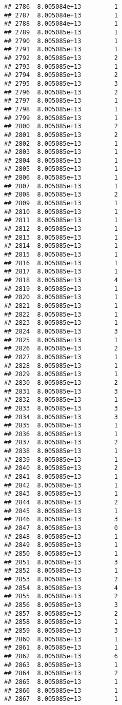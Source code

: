 \documentclass[
]{article}
\begin{document}
\begin{verbatim}
## 2786  8.005084e+13         1
## 2787  8.005084e+13         1
## 2788  8.005084e+13         1
## 2789  8.005085e+13         1
## 2790  8.005085e+13         1
## 2791  8.005085e+13         1
## 2792  8.005085e+13         2
## 2793  8.005085e+13         1
## 2794  8.005085e+13         2
## 2795  8.005085e+13         3
## 2796  8.005085e+13         2
## 2797  8.005085e+13         1
## 2798  8.005085e+13         1
## 2799  8.005085e+13         1
## 2800  8.005085e+13         2
## 2801  8.005085e+13         2
## 2802  8.005085e+13         1
## 2803  8.005085e+13         1
## 2804  8.005085e+13         1
## 2805  8.005085e+13         1
## 2806  8.005085e+13         1
## 2807  8.005085e+13         1
## 2808  8.005085e+13         2
## 2809  8.005085e+13         1
## 2810  8.005085e+13         1
## 2811  8.005085e+13         1
## 2812  8.005085e+13         1
## 2813  8.005085e+13         1
## 2814  8.005085e+13         1
## 2815  8.005085e+13         1
## 2816  8.005085e+13         1
## 2817  8.005085e+13         1
## 2818  8.005085e+13         4
## 2819  8.005085e+13         1
## 2820  8.005085e+13         1
## 2821  8.005085e+13         1
## 2822  8.005085e+13         1
## 2823  8.005085e+13         1
## 2824  8.005085e+13         3
## 2825  8.005085e+13         1
## 2826  8.005085e+13         2
## 2827  8.005085e+13         1
## 2828  8.005085e+13         1
## 2829  8.005085e+13         1
## 2830  8.005085e+13         2
## 2831  8.005085e+13         3
## 2832  8.005085e+13         1
## 2833  8.005085e+13         3
## 2834  8.005085e+13         3
## 2835  8.005085e+13         1
## 2836  8.005085e+13         1
## 2837  8.005085e+13         2
## 2838  8.005085e+13         1
## 2839  8.005085e+13         1
## 2840  8.005085e+13         2
## 2841  8.005085e+13         1
## 2842  8.005085e+13         1
## 2843  8.005085e+13         1
## 2844  8.005085e+13         2
## 2845  8.005085e+13         1
## 2846  8.005085e+13         3
## 2847  8.005085e+13         0
## 2848  8.005085e+13         1
## 2849  8.005085e+13         1
## 2850  8.005085e+13         1
## 2851  8.005085e+13         3
## 2852  8.005085e+13         1
## 2853  8.005085e+13         2
## 2854  8.005085e+13         4
## 2855  8.005085e+13         2
## 2856  8.005085e+13         3
## 2857  8.005085e+13         2
## 2858  8.005085e+13         1
## 2859  8.005085e+13         3
## 2860  8.005085e+13         1
## 2861  8.005085e+13         1
## 2862  8.005085e+13         6
## 2863  8.005085e+13         1
## 2864  8.005085e+13         2
## 2865  8.005085e+13         1
## 2866  8.005085e+13         1
## 2867  8.005085e+13         1

\end{verbatim}
\end{document}
